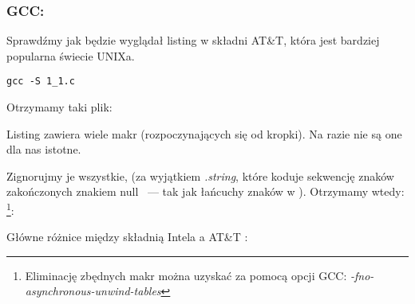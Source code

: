 \subsubsection{GCC: \ATTSyntax}
\label{ATT_syntax}

Sprawdźmy jak będzie wyglądał listing w składni AT\&T, która jest bardziej popularna świecie UNIXa.

\begin{lstlisting}[caption=Kompilujemy za pomocą GCC 4.7.3]
gcc -S 1_1.c
\end{lstlisting}

Otrzymamy taki plik:



Listing zawiera wiele makr (rozpoczynających się od kropki). Na razie nie są one dla nas istotne.

Zignorujmy je wszystkie, (za wyjątkiem \emph{.string}, które koduje sekwencję znaków zakończonych znakiem null ~--- tak jak łańcuchy znaków w \Cpp). Otrzymamy wtedy:
\footnote{Eliminację zbędnych makr można uzyskać za pomocą opcji GCC: \emph{-fno-asynchronous-unwind-tables}}:



\myindex{\ATTSyntax}
\myindex{\IntelSyntax}
Główne różnice między składnią Intela a AT\&T :

